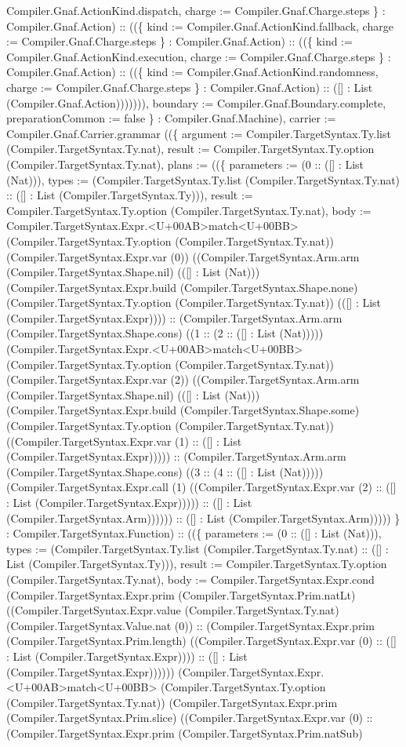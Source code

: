 \documentclass[11pt]{article}
\begin{document}
Compiler.Gnaf.ActionKind.dispatch, charge := Compiler.Gnaf.Charge.steps \} : Compiler.Gnaf.Action) :: ((\{ kind := Compiler.Gnaf.ActionKind.fallback, charge := Compiler.Gnaf.Charge.steps \} : Compiler.Gnaf.Action) :: ((\{ kind := Compiler.Gnaf.ActionKind.execution, charge := Compiler.Gnaf.Charge.steps \} : Compiler.Gnaf.Action) :: ((\{ kind := Compiler.Gnaf.ActionKind.randomness, charge := Compiler.Gnaf.Charge.steps \} : Compiler.Gnaf.Action) :: ([] : List (Compiler.Gnaf.Action))))))), boundary := Compiler.Gnaf.Boundary.complete, preparationCommon := false \} : Compiler.Gnaf.Machine), carrier := Compiler.Gnaf.Carrier.grammar ((\{ argument := Compiler.TargetSyntax.Ty.list (Compiler.TargetSyntax.Ty.nat), result := Compiler.TargetSyntax.Ty.option (Compiler.TargetSyntax.Ty.nat), plans := ((\{ parameters := (0 :: ([] : List (Nat))), types := (Compiler.TargetSyntax.Ty.list (Compiler.TargetSyntax.Ty.nat) :: ([] : List (Compiler.TargetSyntax.Ty))), result := Compiler.TargetSyntax.Ty.option (Compiler.TargetSyntax.Ty.nat), body := Compiler.TargetSyntax.Expr.<U+00AB>match<U+00BB> (Compiler.TargetSyntax.Ty.option (Compiler.TargetSyntax.Ty.nat)) (Compiler.TargetSyntax.Expr.var (0)) ((Compiler.TargetSyntax.Arm.arm (Compiler.TargetSyntax.Shape.nil) (([] : List (Nat))) (Compiler.TargetSyntax.Expr.build (Compiler.TargetSyntax.Shape.none) (Compiler.TargetSyntax.Ty.option (Compiler.TargetSyntax.Ty.nat)) (([] : List (Compiler.TargetSyntax.Expr)))) :: (Compiler.TargetSyntax.Arm.arm (Compiler.TargetSyntax.Shape.cons) ((1 :: (2 :: ([] : List (Nat))))) (Compiler.TargetSyntax.Expr.<U+00AB>match<U+00BB> (Compiler.TargetSyntax.Ty.option (Compiler.TargetSyntax.Ty.nat)) (Compiler.TargetSyntax.Expr.var (2)) ((Compiler.TargetSyntax.Arm.arm (Compiler.TargetSyntax.Shape.nil) (([] : List (Nat))) (Compiler.TargetSyntax.Expr.build (Compiler.TargetSyntax.Shape.some) (Compiler.TargetSyntax.Ty.option (Compiler.TargetSyntax.Ty.nat)) ((Compiler.TargetSyntax.Expr.var (1) :: ([] : List (Compiler.TargetSyntax.Expr))))) :: (Compiler.TargetSyntax.Arm.arm (Compiler.TargetSyntax.Shape.cons) ((3 :: (4 :: ([] : List (Nat))))) (Compiler.TargetSyntax.Expr.call (1) ((Compiler.TargetSyntax.Expr.var (2) :: ([] : List (Compiler.TargetSyntax.Expr))))) :: ([] : List (Compiler.TargetSyntax.Arm)))))) :: ([] : List (Compiler.TargetSyntax.Arm))))) \} : Compiler.TargetSyntax.Function) :: ((\{ parameters := (0 :: ([] : List (Nat))), types := (Compiler.TargetSyntax.Ty.list (Compiler.TargetSyntax.Ty.nat) :: ([] : List (Compiler.TargetSyntax.Ty))), result := Compiler.TargetSyntax.Ty.option (Compiler.TargetSyntax.Ty.nat), body := Compiler.TargetSyntax.Expr.cond (Compiler.TargetSyntax.Expr.prim (Compiler.TargetSyntax.Prim.natLt) ((Compiler.TargetSyntax.Expr.value (Compiler.TargetSyntax.Ty.nat) (Compiler.TargetSyntax.Value.nat (0)) :: (Compiler.TargetSyntax.Expr.prim (Compiler.TargetSyntax.Prim.length) ((Compiler.TargetSyntax.Expr.var (0) :: ([] : List (Compiler.TargetSyntax.Expr)))) :: ([] : List (Compiler.TargetSyntax.Expr)))))) (Compiler.TargetSyntax.Expr.<U+00AB>match<U+00BB> (Compiler.TargetSyntax.Ty.option (Compiler.TargetSyntax.Ty.nat)) (Compiler.TargetSyntax.Expr.prim (Compiler.TargetSyntax.Prim.slice) ((Compiler.TargetSyntax.Expr.var (0) :: (Compiler.TargetSyntax.Expr.prim (Compiler.TargetSyntax.Prim.natSub) 
\end{document}
